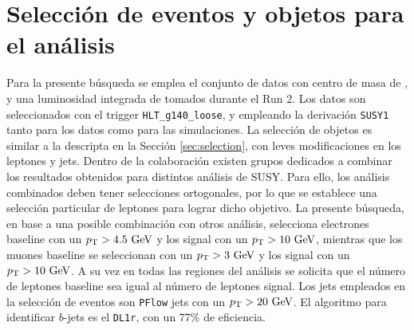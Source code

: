 \begin{table}[h!]
  \centering
  \caption{Muestras de fondos de MC con producción de tops y bosones de Higgs decayendo a fotones, utilizadas en el análisis con producción electrodébil, donde se especifica su generador, sección eficaz, $k$-factor y eficiencia de filtro.}
  \label{tab:higgs_bkg}
\end{table}



\section{Selección de eventos y objetos para el análisis}

Para la presente búsqueda se emplea el conjunto de datos con centro de masa de , y una luminosidad integrada de  tomados durante el Run 2. Los datos son seleccionados con el trigger \texttt{HLT\_g140\_loose}, y empleando la derivación \texttt{SUSY1} tanto para los datos como para las simulaciones. La selección de objetos es similar a la descripta en la Sección \ref{sec:selection}, con leves modificaciones en los leptones y jets. Dentro de la colaboración existen grupos dedicados a combinar los resultados obtenidos para distintos análisis de SUSY. Para ello, los análisis combinados deben tener selecciones ortogonales, por lo que se establece una selección particular de leptones para lograr dicho objetivo. La presente búsqueda, en base a una posible combinación con otros análisis, selecciona electrones baseline con un $\pt>4.5\ \gev$ y los signal con un $\pt>10 \ \gev$, mientras que los muones baseline se seleccionan con un $p_{\text{T}}>3\ \text{GeV}$ y los signal con un $\pt>10\ \gev$. A su vez en todas las regiones del análisis se solicita que el número de leptones baseline sea igual al número de leptones signal. Los jets empleados en la selección de eventos son \texttt{PFlow} jets con un $p_{\text{T}}>20\ \text{GeV}$. El algoritmo para identificar $b$-jets es el \texttt{DL1r}, con un $77\%$ de eficiencia.



